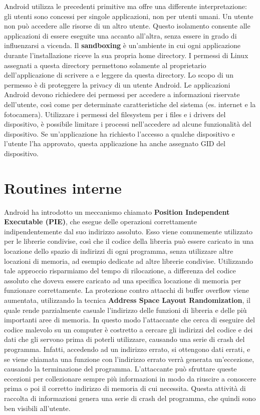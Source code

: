 Android utilizza le precedenti primitive ma offre una differente interpretazione: gli utenti sono concessi per singole applicazioni, non per utenti umani. Un utente non può accedere alle risorse di un altro utente. Questo isolamento consente alle applicazioni di essere eseguite una accanto all'altra, senza essere in grado di influenzarsi a vicenda. Il \textbf{sandboxing} è un'ambiente in cui ogni applicazione durante l'installazione riceve la sua propria home directory. I permessi di Linux assegnati a questa directory permettono solamente al proprietario dell'applicazione di scrivere a e leggere da questa directory. Lo scopo di un permesso è di proteggere la privacy di un utente Android. Le applicazioni Android devono richiedere dei permessi per accedere a informazioni riservate dell'utente, così come per determinate caratteristiche del sistema (es. internet e la fotocamera). Utilizzare i permessi del filesystem per i files e i drivers del dispositivo, è possibile limitare i processi nell'accedere ad alcune funzionalità del dispositivo. Se un'applicazione ha richiesto l'accesso a qualche dispositivo e l'utente l'ha approvato, questa applicazione ha anche assegnato GID del dispositivo.

\section{Routines interne}
Android ha introdotto un meccanismo chiamato \textbf{Position Independent Executable (PIE)}, che esegue delle operazioni correttamente indipendentemente dal suo indirizzo assoluto. Esso viene comunemente utilizzato per le librerie condivise, così che il codice della libreria può essere caricato in una locazione dello spazio di indirizzi di ogni programma, senza utilizzare altre locazioni di memoria, ad esempio dedicate ad altre librerie condivise. Utilizzando tale approccio risparmiamo del tempo di rilocazione, a differenza del codice assoluto che doveva essere caricato ad una specifica locazione di memoria per funzionare correttamente. La protezione contro attacchi di buffer overflow viene aumentata, utilizzando la tecnica \textbf{Address Space Layout Randomization}, il quale rende parzialmente casuale l'indirizzo delle funzioni di libreria e delle più importanti aree di memoria. In questo modo l'attaccante che cerca di eseguire del codice malevolo su un computer è costretto a cercare gli indirizzi del codice e dei dati che gli servono prima di poterli utilizzare, causando una serie di crash del programma. Infatti, accedendo ad un indirizzo errato, si ottengono dati errati, e se viene chiamata una funzione con l'indirizzo errato verrà generata un'eccezione, causando la terminazione del programma. L'attaccante può sfruttare queste eccezioni per collezionare sempre più informazioni in modo da riuscire a conoscere prima o poi il corretto indirizzo di memoria di cui necessita. Questa attività di raccolta di informazioni genera una serie di crash del programma, che quindi sono ben visibili all'utente.

